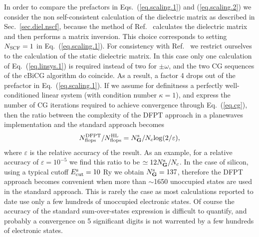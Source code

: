 \documentclass[twocolumn,prb,showpacs,superscriptaddress]{revtex4}
\def\w{\omega}
\def\G{{\bf G}}
\begin{document}
In order to compare the prefactors in Eqs.\ (\ref{eq.scaling.1}) and (\ref{eq.scaling.2})
we consider the non self-consistent calculation of the dielectric matrix as described in Sec.\ \ref{sec.diel.nscf},
because the method of Ref.\  calculates the dielectric matrix and then performs a matrix inversion.
This choice corresponds to setting $N_{\rm SCF}=1$ in Eq.\ (\ref{eq.scaling.1}). 
For consistency with Ref.\  we restrict ourselves to 
the calculation of the static dielectric matrix.
In this case only one calculation of Eq.\ (\ref{eq.linsys.1}) is required instead of two for $\pm\w$, 
and the two CG sequences of the cBiCG algorithm do coincide.
As a result, a factor 4 drops out of the prefactor in Eq.\ (\ref{eq.scaling.1}).
If we assume for definitness a perfectly well-conditioned linear system (with condition number $\kappa=1$),
and express the number of CG iterations required to achieve convergence through Eq.\ (\ref{eq.cg}),
then the ratio between the complexity of the DFPT approach in a planewaves
implementation and the standard approach becomes
   \begin{equation}\label{eq.ratio.flops}
   N^{\rm DFPT}_{\rm flops}/N^{\rm HL}_{\rm flops} = N_\G^{\rm s}/N_c {\rm log}(2/\varepsilon),
   \end{equation}
where $\varepsilon$ is the relative accuracy of the result.
As an example, for a relative accuracy of $\varepsilon=10^{-5}$ 
we find this ratio to be $\simeq 12 N_\G^{\rm s}/N_c$.
In the case of silicon, using a typical cutoff $E_{\rm cut}^{\rm s}=10$ Ry we obtain $N_\G^{\rm s}=137$, therefore
the DFPT approach becomes convenient when more than $\sim$1650 unoccupied states are used
in the standard approach.
This is rarely the case as most calculations reported to date use only a few hundreds of 
unoccupied electronic states.
Of course the accuracy of the standard sum-over-states expression is difficult to
quantify, and probably a convergence on 5 significant digits is not warrented by a few
hundreds of electronic states. 
\end{document}
